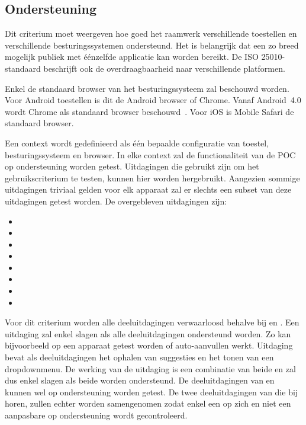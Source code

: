 
\subsection{Ondersteuning}
\label{sec:vergelijking-ondersteuning}
Dit criterium moet weergeven hoe goed het raamwerk verschillende toestellen en verschillende besturingssystemen ondersteund.
Het is belangrijk dat een zo breed mogelijk publiek met éénzelfde applicatie kan worden bereikt.
De ISO 25010-standaard beschrijft ook de overdraagbaarheid naar verschillende platformen.

Enkel de standaard browser van het besturingssysteem zal beschouwd worden.
Voor Android toestellen is dit de Android browser of Chrome.  
Vanaf Android~4.0 wordt Chrome als standaard browser beschouwd~\cite{Wimberly2008}.
Voor iOS is Mobile Safari de standaard browser.

Een context wordt gedefinieerd als één bepaalde configuratie van toestel, besturingssysteem en browser.
In elke context zal de functionaliteit van de POC op ondersteuning worden getest.
Uitdagingen die gebruikt zijn om het gebruikscriterium te testen, kunnen hier worden hergebruikt.
Aangezien sommige uitdagingen triviaal gelden voor elk apparaat zal er slechts een subset van deze uitdagingen getest worden.
De overgebleven uitdagingen zijn:
\begin{itemize}
 \item {}
 \item {}
 \item {}
 \item {}
 \item {}
 \item {}
 \item {}
 \item {}
\end{itemize}
Voor dit criterium worden alle deeluitdagingen verwaarloosd behalve bij  en .
Een uitdaging zal enkel slagen als alle deeluitdagingen ondersteund worden.
Zo kan bijvoorbeeld op een apparaat getest worden of auto-aanvullen werkt.
Uitdaging  bevat als deeluitdagingen het ophalen van suggesties en het tonen van een dropdownmenu.
De werking van de uitdaging is een combinatie van beide en zal dus enkel slagen als beide worden ondersteund.
De deeluitdagingen van  en  kunnen wel op ondersteuning worden getest.
De twee deeluitdagingen van  die bij  horen, zullen echter worden samengenomen zodat enkel een  op zich en niet een aanpasbare  op ondersteuning wordt gecontroleerd.


